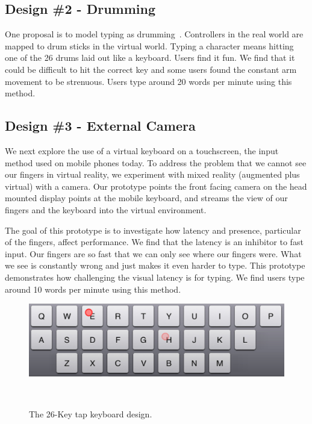 \subsection{Design \#2 - Drumming}
One proposal is to model typing as drumming~\cite{google_drums}.
Controllers in the real world are mapped to drum sticks in the virtual world.  
Typing a character means hitting one of the 26 drums laid out like a keyboard.
Users find it fun.
We find that it could be difficult to hit the correct key and some users found the constant arm movement to be strenuous.
Users type around 20 words per minute using this method.

\subsection{Design \#3 - External Camera}

We next explore the use of a virtual keyboard on a touchscreen, the input method used on mobile phones today.
To address the problem that we cannot see our fingers in virtual reality, we experiment with mixed reality (augmented plus virtual) with a camera.
Our prototype points the front facing camera on the head mounted display points at the mobile keyboard, and streams the view of our fingers and the keyboard into the virtual environment. 

The goal of this prototype is to investigate how latency and presence, particular of the fingers, affect performance.
We find that the latency is an inhibitor to fast input.
Our fingers are so fast that we can only see where our fingers were.
What we see is constantly wrong and just makes it even harder to type.
This prototype demonstrates how challenging the visual latency is for typing. 
We find users type around 10 words per minute using this method.


\begin{figure}[!htb]
  \centering

  \includegraphics[width=1\columnwidth]{figures/26-Tap}

  \caption{The 26-Key tap keyboard design.}
  ~\label{fig:multiword}
\end{figure}


